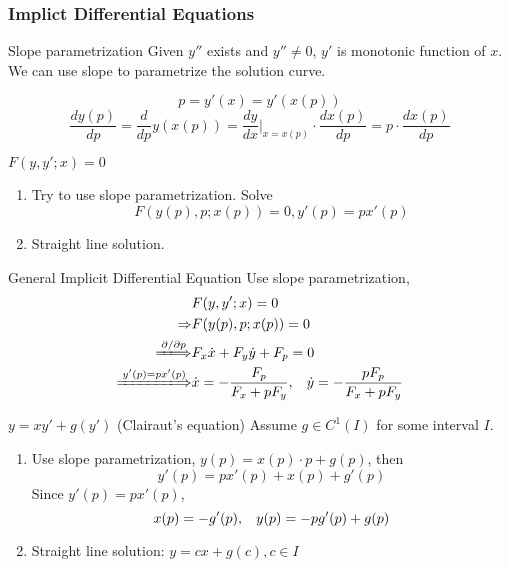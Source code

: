 \documentclass{beamer}
\begin{document}
\begin{frame}
\frametitle{Implict Differential Equations}
\begin{block}{Slope parametrization}
Given $y''$ exists and $y''\neq0$, $y'$ is monotonic function of $x$. We can use slope to parametrize the solution curve.

$$p=y'(x)=y'(x(p))$$
$$\dfrac{dy(p)}{dp}=\dfrac{d}{dp}y(x(p))=\dfrac{dy}{dx}\Big|_{x=x(p)}\cdot \dfrac{dx(p)}{dp}=p\cdot\dfrac{dx(p)}{dp}$$
\end{block}
\begin{block}{$F(y,y';x)=0$}
\begin{enumerate}
\item Try to use slope parametrization. Solve
$$F(y(p),p;x(p))=0,y'(p)=px'(p)$$
\item Straight line solution.
\end{enumerate}

\end{block}

\end{frame}

\begin{frame}
\begin{block}{General Implicit Differential Equation}
Use slope parametrization,
\begin{align*}
&F(y,y';x)=0\\
\Rightarrow&F(y(p),p;x(p))=0\\
\xLongrightarrow{\partial/\partial p}& F_x\dot{x}+F_y\dot{y}+F_p=0\\
\xLongrightarrow{y'(p)=px'(p)}&\dot{x}=-\dfrac{F_p}{F_x+pF_y},\hspace{3mm}\dot{y}=-\dfrac{pF_p}{F_x+pF_y}
\end{align*}
\end{block}
\end{frame}

\begin{frame}
\begin{block}{$y=xy'+g(y')$ (Clairaut's equation)}
Assume $g\in C^1(I)$ for some interval $I$. 
\begin{enumerate}
\item Use slope parametrization, $y(p)=x(p)\cdot p+g(p)$, then
$$y'(p)=px'(p)+x(p)+g'(p)$$
Since $y'(p)=px'(p)$, 
$$x(p)=-g'(p),\hspace{3mm}y(p)=-pg'(p)+g(p)$$
\item Straight line solution:
$y=cx+g(c),c\in I$
\end{enumerate} 
\end{block}
\end{frame}
\end{document}
